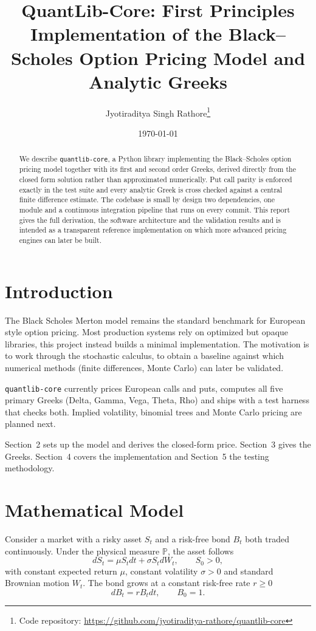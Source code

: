 \documentclass[twocolumn,10pt]{article}
\title{\textbf{QuantLib-Core: First Principles Implementation of the Black--Scholes Option Pricing Model and Analytic Greeks}}
\author{Jyotiraditya Singh Rathore\thanks{Code repository: \url{https://github.com/jyotiraditya-rathore/quantlib-core}}}
\date{\today}
\begin{document}
\maketitle

\begin{abstract}
We describe \texttt{quantlib-core}, a Python library implementing the Black--Scholes option pricing model together with its first and second order Greeks, derived directly from the closed form solution rather than approximated numerically. Put call parity is enforced exactly in the test suite and every analytic Greek is cross checked against a central finite difference estimate. The codebase is small by design two dependencies, one module and a continuous integration pipeline that runs on every commit. This report gives the full derivation, the software architecture and the validation results and is intended as a transparent reference implementation on which more advanced pricing engines can later be built.
\end{abstract}

\section{Introduction}
The Black Scholes Merton model \cite{Black1973} remains the standard benchmark for European style option pricing. Most production systems rely on optimized but opaque libraries, this project instead builds a minimal implementation. The motivation is to work through the stochastic calculus, to obtain a baseline against which numerical methods (finite differences, Monte Carlo) can later be validated.

\texttt{quantlib-core} currently prices European calls and puts, computes all five primary Greeks (Delta, Gamma, Vega, Theta, Rho) and ships with a test harness that checks both. Implied volatility, binomial trees and Monte Carlo pricing are planned next.

Section~2 sets up the model and derives the closed-form price. Section~3 gives the Greeks. Section~4 covers the implementation and Section~5 the testing methodology.

\section{Mathematical Model}
\label{sec:model}

Consider a market with a risky asset $S_t$ and a risk-free bond $B_t$ both traded continuously. Under the physical measure $\mathbb{P}$, the asset follows
\begin{equation}
    dS_t = \mu S_t dt + \sigma S_t dW_t, \qquad S_0 > 0,
    \label{eq:gbm}
\end{equation}
with constant expected return $\mu$, constant volatility $\sigma > 0$ and standard Brownian motion $W_t$. The bond grows at a constant risk-free rate $r \geq 0$
\begin{equation}
    dB_t = r B_t dt, \qquad B_0 = 1.
\end{equation}
\end{document}

